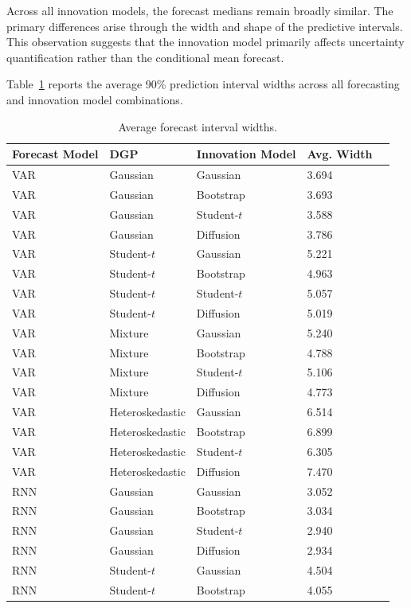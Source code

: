 \documentclass[11pt]{article}
\begin{document}
Across all innovation models, the forecast medians remain broadly similar. The primary differences arise through the width and shape of the predictive intervals. This observation suggests that the innovation model primarily affects uncertainty quantification rather than the conditional mean forecast.

Table~\ref{tab:forecast_widths} reports the average 90\% prediction interval widths across all forecasting and innovation model combinations.

\begin{table}[H]
\centering
\caption{Average forecast interval widths.}
\label{tab:forecast_widths}
\small
\begin{tabular}{llllr}
\toprule
Forecast Model & DGP & Innovation Model & Avg. Width \\
\midrule
VAR & Gaussian & Gaussian & 3.694 \\
VAR & Gaussian & Bootstrap & 3.693 \\
VAR & Gaussian & Student-$t$ & 3.588 \\
VAR & Gaussian & Diffusion & 3.786 \\
\midrule
VAR & Student-$t$ & Gaussian & 5.221 \\
VAR & Student-$t$ & Bootstrap & 4.963 \\
VAR & Student-$t$ & Student-$t$ & 5.057 \\
VAR & Student-$t$ & Diffusion & 5.019 \\
\midrule
VAR & Mixture & Gaussian & 5.240 \\
VAR & Mixture & Bootstrap & 4.788 \\
VAR & Mixture & Student-$t$ & 5.106 \\
VAR & Mixture & Diffusion & 4.773 \\
\midrule
VAR & Heteroskedastic & Gaussian & 6.514 \\
VAR & Heteroskedastic & Bootstrap & 6.899 \\
VAR & Heteroskedastic & Student-$t$ & 6.305 \\
VAR & Heteroskedastic & Diffusion & 7.470 \\
\midrule
RNN & Gaussian & Gaussian & 3.052 \\
RNN & Gaussian & Bootstrap & 3.034 \\
RNN & Gaussian & Student-$t$ & 2.940 \\
RNN & Gaussian & Diffusion & 2.934 \\
\midrule
RNN & Student-$t$ & Gaussian & 4.504 \\
RNN & Student-$t$ & Bootstrap & 4.055 \\

\end{tabular}
\end{table}
\end{document}
